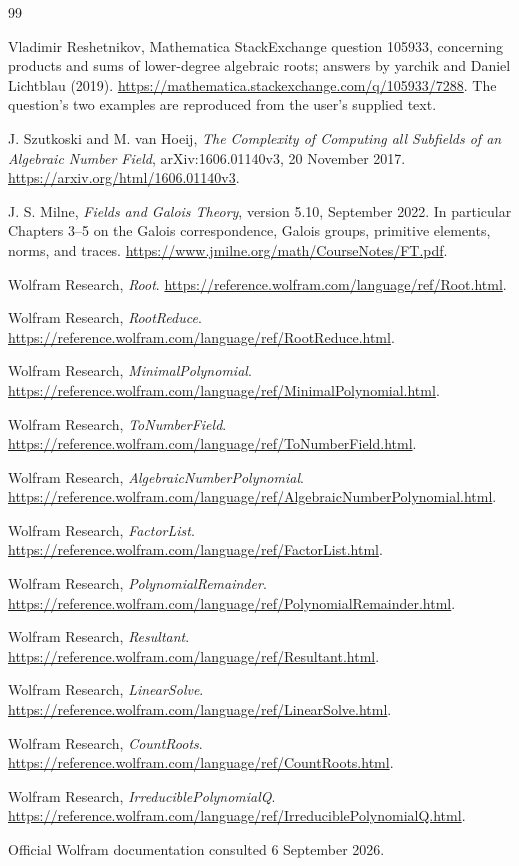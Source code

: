 \documentclass[11pt,letterpaper]{article}
\theoremstyle{definition}
\theoremstyle{remark}
\begin{document}
\vspace{1em}
\begin{thebibliography}{99}
\small\setlength{\itemsep}{3pt}\setlength{\parskip}{0pt}
Vladimir Reshetnikov, Mathematica StackExchange question 105933, concerning
products and sums of lower-degree algebraic roots; answers by yarchik and
Daniel Lichtblau (2019).
\url{https://mathematica.stackexchange.com/q/105933/7288}.
The question's two examples are reproduced from the user's supplied text.

J. Szutkoski and M. van Hoeij,
\emph{The Complexity of Computing all Subfields of an Algebraic Number
Field}, arXiv:1606.01140v3, 20 November 2017.
\url{https://arxiv.org/html/1606.01140v3}.

J. S. Milne, \emph{Fields and Galois Theory}, version 5.10, September 2022.
In particular Chapters 3--5 on the Galois correspondence, Galois groups,
primitive elements, norms, and traces.
\url{https://www.jmilne.org/math/CourseNotes/FT.pdf}.

Wolfram Research, \emph{Root}.
\url{https://reference.wolfram.com/language/ref/Root.html}.

Wolfram Research, \emph{RootReduce}.
\url{https://reference.wolfram.com/language/ref/RootReduce.html}.

Wolfram Research, \emph{MinimalPolynomial}.
\url{https://reference.wolfram.com/language/ref/MinimalPolynomial.html}.

Wolfram Research, \emph{ToNumberField}.
\url{https://reference.wolfram.com/language/ref/ToNumberField.html}.

Wolfram Research, \emph{AlgebraicNumberPolynomial}.
\url{https://reference.wolfram.com/language/ref/AlgebraicNumberPolynomial.html}.

Wolfram Research, \emph{FactorList}.
\url{https://reference.wolfram.com/language/ref/FactorList.html}.

Wolfram Research, \emph{PolynomialRemainder}.
\url{https://reference.wolfram.com/language/ref/PolynomialRemainder.html}.

Wolfram Research, \emph{Resultant}.
\url{https://reference.wolfram.com/language/ref/Resultant.html}.

Wolfram Research, \emph{LinearSolve}.
\url{https://reference.wolfram.com/language/ref/LinearSolve.html}.

Wolfram Research, \emph{CountRoots}.
\url{https://reference.wolfram.com/language/ref/CountRoots.html}.

Wolfram Research, \emph{IrreduciblePolynomialQ}.
\url{https://reference.wolfram.com/language/ref/IrreduciblePolynomialQ.html}.
\end{thebibliography}
{\small Official Wolfram documentation consulted 6 September 2026.}
\end{document}
